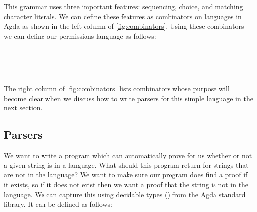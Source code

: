 This grammar uses three important features: sequencing, choice, and matching
character literals. We can define these features as combinators on languages in
Agda as shown in the left column of \cref{fig:combinators}. Using these
combinators we can define our permissions language as follows:
%
\begin{code}[hide]%
%
\>[4]\AgdaSpace{}%
\AgdaSpace{}%
\AgdaSpace{}%
\AgdaSpace{}%
\AgdaSymbol{:}\AgdaSpace{}%
\<%
\end{code}
\begin{code}%
%
\>[4]%
\>[17]\AgdaSymbol{=}\AgdaSpace{}%
\AgdaSpace{}%
\AgdaSpace{}%
\AgdaSpace{}%
\AgdaSpace{}%
\<%
\\
%
\>[4]%
\>[17]\AgdaSymbol{=}\AgdaSpace{}%
\AgdaSpace{}%
\AgdaSpace{}%
\AgdaSpace{}%
\AgdaSpace{}%
\<%
\\
%
\>[4]%
\>[17]\AgdaSymbol{=}\AgdaSpace{}%
\AgdaSpace{}%
\AgdaSpace{}%
\AgdaSpace{}%
\AgdaSpace{}%
\<%
\\
%
\>[4]%
\>[17]\AgdaSymbol{=}\AgdaSpace{}%
\AgdaSpace{}%
\AgdaSpace{}%
\AgdaSpace{}%
\AgdaSpace{}%
\<%
\end{code}

The right column of \cref{fig:combinators} lists combinators whose purpose will become clear when we discuss how to write parsers for this simple language in the next section.

\subsection{Parsers}

We want to write a program which can automatically prove for us whether or not a
given string is in a language. What should this program return for strings that
are not in the language? We want to make sure our program does find a proof if
it exists, so if it does not exist then we want a proof that the string is not
in the language. We can capture this using decidable types () from the Agda
standard library. It can be defined as follows:

